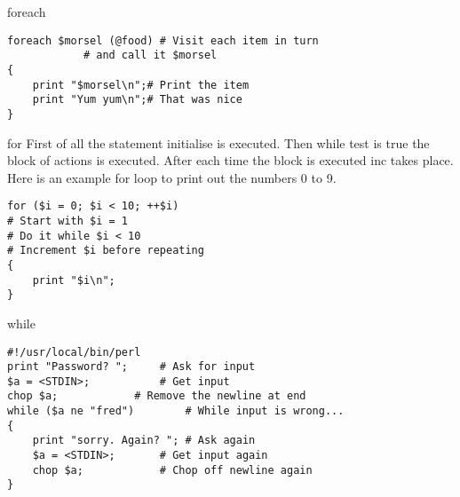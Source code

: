 \begin{frame}[containsverbatim]{foreach}
\lstset{language=perl}
\begin{lstlisting}
foreach $morsel (@food)	# Visit each item in turn
			# and call it $morsel
{
	print "$morsel\n";# Print the item
	print "Yum yum\n";# That was nice
}
\end{lstlisting}
\end{frame}

\begin{frame}[containsverbatim]{for}
First of all the statement initialise is executed. Then while test is true the block of actions is executed. After each time the block is executed inc takes place. Here is an example for loop to print out the numbers 0 to 9. 
\lstset{language=perl}
\begin{lstlisting}
for ($i = 0; $i < 10; ++$i)
# Start with $i = 1
# Do it while $i < 10
# Increment $i before repeating
{
	print "$i\n";
}
\end{lstlisting}
\end{frame}

\begin{frame}[containsverbatim]{while}
\lstset{language=perl}
\begin{lstlisting}
#!/usr/local/bin/perl
print "Password? ";		# Ask for input
$a = <STDIN>;			# Get input
chop $a;			# Remove the newline at end
while ($a ne "fred")		# While input is wrong...
{
    print "sorry. Again? ";	# Ask again
    $a = <STDIN>;		# Get input again
    chop $a;			# Chop off newline again
}
\end{lstlisting}
\end{frame}


